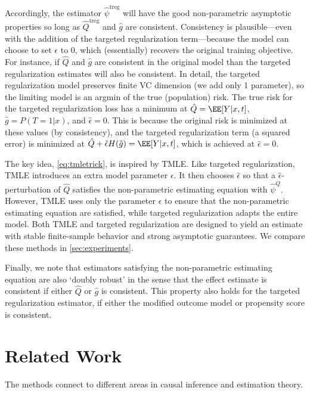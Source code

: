 \documentclass{article}
\begin{document}
Accordingly, the estimator $\hat{\psi}^{\mathrm{treg}}$ will have the good non-parametric asymptotic properties
so long as $\hat{Q}^{\mathrm{treg}}$ and $\hat{g}$ are consistent.
Consistency is plausible---even with the addition of the targeted regularization term---because
the model can choose to set $\epsilon$ to 0, which (essentially) recovers the
original training objective.
For instance, if $\hat{Q}$ and $\hat{g}$ are consistent in the original model than the targeted regularization
estimates will also be consistent.
In detail, the targeted regularization model preserves finite VC dimension (we add only 1 parameter), so the limiting model is an argmin of the true (population) risk.
The true risk for the targeted regularization loss has a minimum at $\hat{Q}=\EE[Y | x,t]$, $\hat{g}=P(T=1 | x)$, and $\hat{\epsilon}=0$. This is because the original risk is minimized at these values (by consistency), and the targeted regularization term (a squared error) is minimized at $\hat{Q}+\hat{\epsilon}H(\hat{g}) = \EE[Y | x,t]$, which is achieved at $\hat{\epsilon}=0$.


The key idea, \cref{eq:tmletrick}, is inspired by TMLE.
Like targeted regularization, TMLE introduces an extra model parameter $\epsilon$.
It then chooses $\hat{\epsilon}$ so that a $\hat{\epsilon}$-perturbation of $\hat{Q}$
satisfies the non-parametric estimating equation with $\hat{\psi}^Q$.
However, TMLE uses only the parameter $\epsilon$ to ensure that the non-parametric
estimating equation are satisfied, while targeted regularization adapts the entire model.
Both TMLE and targeted regularization are designed to
yield an estimate with stable finite-sample behavior and
strong asymptotic guarantees. We compare these methods in \cref{sec:experiments}.

Finally, we note that estimators satisfying the non-parametric estimating equation are also `doubly robust' in the sense
that the effect estimate is consistent if either $\hat{Q}$ or $\hat{g}$ is consistent.
This property also holds for the targeted regularization estimator, if either the modified outcome model or propensity score is consistent.

\section{Related Work}
\label{sec:related_work}
The methods connect to different areas in causal inference and estimation theory.   
\end{document}

